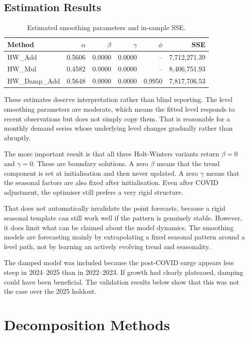 \documentclass[runningheads]{llncs}
\begin{document}
\subsection{Estimation Results}
\begin{table}[tbp]
\caption{Estimated smoothing parameters and in-sample SSE.}
\label{tab:smoothing}
\centering
\begin{tabular}{lrrrrr}
\toprule
Method & $\alpha$ & $\beta$ & $\gamma$ & $\phi$ & SSE \\
\midrule
HW\_Add & 0.5606 & 0.0000 & 0.0000 & -- & 7,712,271.39 \\
HW\_Mul & 0.4582 & 0.0000 & 0.0000 & -- & 8,406,751.93 \\
HW\_Damp\_Add & 0.5648 & 0.0000 & 0.0000 & 0.9950 & 7,817,706.53 \\
\bottomrule
\end{tabular}
\end{table}

These estimates deserve interpretation rather than blind reporting. The level smoothing parameters are moderate, which means the fitted level responds to recent observations but does not simply copy them. That is reasonable for a monthly demand series whose underlying level changes gradually rather than abruptly.

The more important result is that all three Holt-Winters variants return $\beta=0$ and $\gamma=0$. These are boundary solutions. A zero $\beta$ means that the trend component is set at initialisation and then never updated. A zero $\gamma$ means that the seasonal factors are also fixed after initialisation. Even after COVID adjustment, the optimiser still prefers a very rigid structure.

That does not automatically invalidate the point forecasts, because a rigid seasonal template can still work well if the pattern is genuinely stable. However, it does limit what can be claimed about the model dynamics. The smoothing models are forecasting mainly by extrapolating a fixed seasonal pattern around a level path, not by learning an actively evolving trend and seasonality.

The damped model was included because the post-COVID surge appears less steep in 2024--2025 than in 2022--2023. If growth had clearly plateaued, damping could have been beneficial. The validation results below show that this was not the case over the 2025 holdout.

\section{Decomposition Methods}
\end{document}
